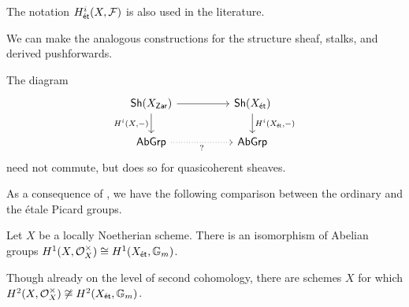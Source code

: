 \begin{remark}
    The notation $H^{i}_{\mathsf{\acute{e}t}}(X,\mathcal{F})$ is also used in the literature. 
\end{remark}
We can make the analogous constructions for the structure sheaf, stalks, and derived pushforwards. 
\begin{remark}\label{rmk: commutes for QCoh}
    The diagram 
    $$%
    \begin{tikzcd}
        {\Sh(X_{\Zar})} && {\Sh(X_{\et})} \\
        \AbGrp && \AbGrp
        \arrow[from=1-1, to=1-3]
        \arrow["{H^{i}(X,-)}"', from=1-1, to=2-1]
        \arrow["{H^{i}(X_{\et},-)}", from=1-3, to=2-3]
        \arrow["{?}"', dotted, from=2-1, to=2-3]
    \end{tikzcd}$$
    need not commute, but does so for quasicoherent sheaves. 
\end{remark}
As a consequence of , we have the following comparison between the ordinary and the \'{e}tale Picard groups. 
\begin{proposition}\label{prop: picard group comparison}
    Let $X$ be a locally Noetherian scheme. There is an isomorphism of Abelian groups $H^{1}(X,\mathcal{O}_{X}^{\times})\cong H^{1}(X_{\mathsf{\acute{e}t}},\mathbb{G}_{m})$. 
\end{proposition}
Though already on the level of second cohomology, there are schemes $X$ for which $H^{2}(X,\mathcal{O}_{X}^{\times})\not\cong H^{2}(X_{\mathsf{\acute{e}t}},\mathbb{G}_{m})$. 


